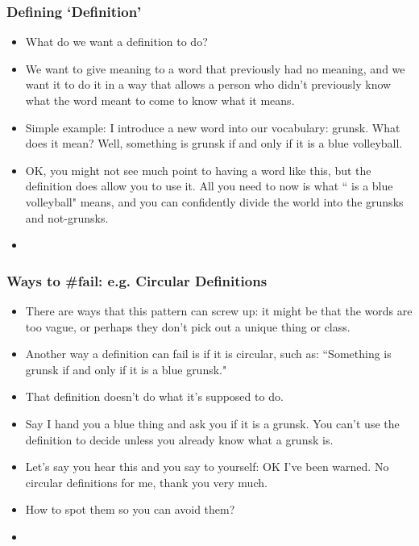  \begin{frame}
\frametitle{Defining `Definition'}

\begin{itemize}[<+->]
\item What do we want a definition to do? 

\item We want to give meaning to a word that previously had no meaning, and we want it to do it in a way that allows a person who didn't previously know what the word meant to come to know what it means.

\item Simple example: I introduce a new word into our vocabulary: grunsk. What does it mean? Well, something is grunsk if and only if it is a blue volleyball. 

\item OK, you might not see much point to having a word like this, but the definition does allow you to use it. All you need to now is what `` is a blue volleyball" means, and you can confidently divide the world into the grunsks and not-grunsks. 
\item[] \end{itemize} 
\end{frame}

 \begin{frame}
\frametitle{Ways to \#fail: e.g. Circular Definitions}

\begin{itemize}[<+->]
\item 
There are ways that this pattern can screw up: it might be that the words are too vague, or perhaps they don't pick out a unique thing or class. 

\item Another way a definition can fail is if it is circular, such as: ``Something is grunsk if and only if it is a blue grunsk." 

\item That definition doesn't do what it's supposed to do.\\

\item Say I hand you a blue thing and ask you if it is a grunsk. You can't use the definition to decide unless you already know what a grunsk is. 

\item Let's say you hear this and you say to yourself: OK I've been warned. No circular definitions for me, thank you very much.

\item How to spot them so you can avoid them?
\item[] \end{itemize} 
\end{frame}

